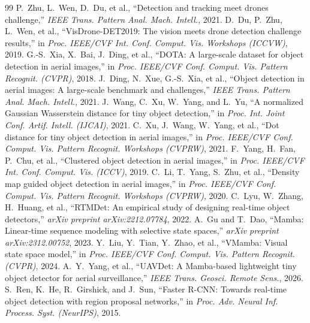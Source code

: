 \documentclass[12pt,a4paper]{report}
\begin{document}
\begin{thebibliography}{99}
 P.~Zhu, L.~Wen, D.~Du, et al., ``Detection and tracking meet drones challenge,'' \emph{IEEE Trans. Pattern Anal. Mach. Intell.}, 2021.
 D.~Du, P.~Zhu, L.~Wen, et al., ``VisDrone-DET2019: The vision meets drone detection challenge results,'' in \emph{Proc. IEEE/CVF Int. Conf. Comput. Vis. Workshops (ICCVW)}, 2019.
 G.-S.~Xia, X.~Bai, J.~Ding, et al., ``DOTA: A large-scale dataset for object detection in aerial images,'' in \emph{Proc. IEEE/CVF Conf. Comput. Vis. Pattern Recognit. (CVPR)}, 2018.
 J.~Ding, N.~Xue, G.-S.~Xia, et al., ``Object detection in aerial images: A large-scale benchmark and challenges,'' \emph{IEEE Trans. Pattern Anal. Mach. Intell.}, 2021.
 J.~Wang, C.~Xu, W.~Yang, and L.~Yu, ``A normalized Gaussian Wasserstein distance for tiny object detection,'' in \emph{Proc. Int. Joint Conf. Artif. Intell. (IJCAI)}, 2021.
 C.~Xu, J.~Wang, W.~Yang, et al., ``Dot distance for tiny object detection in aerial images,'' in \emph{Proc. IEEE/CVF Conf. Comput. Vis. Pattern Recognit. Workshops (CVPRW)}, 2021.
 F.~Yang, H.~Fan, P.~Chu, et al., ``Clustered object detection in aerial images,'' in \emph{Proc. IEEE/CVF Int. Conf. Comput. Vis. (ICCV)}, 2019.
 C.~Li, T.~Yang, S.~Zhu, et al., ``Density map guided object detection in aerial images,'' in \emph{Proc. IEEE/CVF Conf. Comput. Vis. Pattern Recognit. Workshops (CVPRW)}, 2020.
 C.~Lyu, W.~Zhang, H.~Huang, et al., ``RTMDet: An empirical study of designing real-time object detectors,'' \emph{arXiv preprint arXiv:2212.07784}, 2022.
 A.~Gu and T.~Dao, ``Mamba: Linear-time sequence modeling with selective state spaces,'' \emph{arXiv preprint arXiv:2312.00752}, 2023.
 Y.~Liu, Y.~Tian, Y.~Zhao, et al., ``VMamba: Visual state space model,'' in \emph{Proc. IEEE/CVF Conf. Comput. Vis. Pattern Recognit. (CVPR)}, 2024.
 A.~Y.~Yang, et al., ``UAVDet: A Mamba-based lightweight tiny object detector for aerial surveillance,'' \emph{IEEE Trans. Geosci. Remote Sens.}, 2026.
 S.~Ren, K.~He, R.~Girshick, and J.~Sun, ``Faster R-CNN: Towards real-time object detection with region proposal networks,'' in \emph{Proc. Adv. Neural Inf. Process. Syst. (NeurIPS)}, 2015.

\end{thebibliography}
\end{document}
